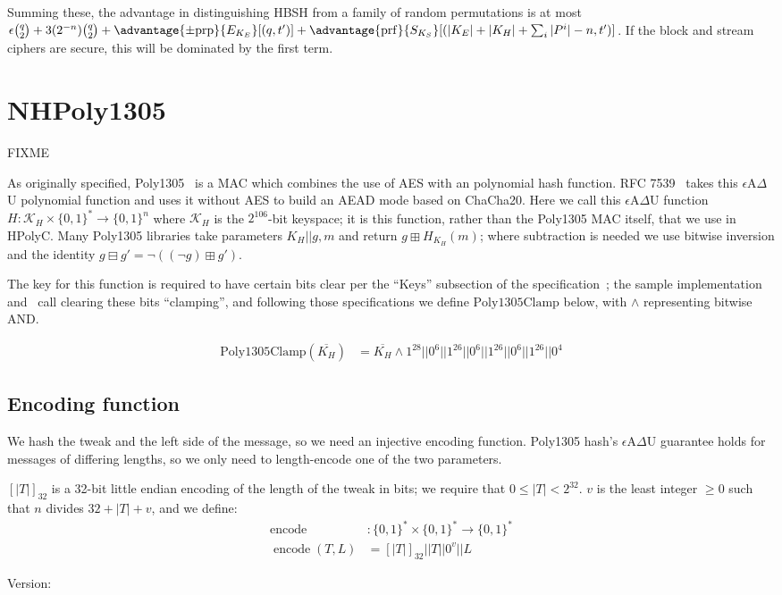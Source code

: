 \documentclass[journal=tosc,preprint,floatrow,submission]{iacrtrans}
\DeclareMathOperator{\encode}{encode}
\begin{document}
Summing these,
the advantage in distinguishing HBSH from a family of random permutations is at most
$\epsilon\binom{q}{2} + 3(2^{-n})\binom{q}{2}
+ \advantage{\pm \mathrm{prp}}{E_{K_E}}[(q, t')]
+ \advantage{\mathrm{prf}}{S_{K_S}}[(|K_E| + |K_H| + \sum_i |P^i|-n, t')]$.
If the block and stream ciphers are secure, this will be
dominated by the first term.

\printbibliography

\appendix
\section{NHPoly1305}\label{NHPoly1305}
FIXME

As originally specified, Poly1305~\cite{poly1305} is a MAC which combines the use of AES with an
polynomial hash function. RFC 7539~\cite{RFC7539} takes this
$\epsilon$A$\Delta$U polynomial function and
uses it without AES to build an AEAD mode based on ChaCha20.
Here we call this $\epsilon$A$\Delta$U function
$H: \mathcal{K}_H \times \{0,1\}^* \rightarrow \{0,1\}^n$ where $\mathcal{K}_H$
is the $2^{106}$-bit keyspace;
it is this function, rather than the Poly1305 MAC itself, that we use in HPolyC.
Many Poly1305 libraries
take parameters $K_H || g, m$ and return $g \boxplus H_{K_H}(m)$; where subtraction
is needed we use bitwise inversion and the identity
$g \boxminus g' = \neg ((\neg g) \boxplus g')$.

The key for this function is required to have certain bits clear per the ``Keys''
subsection of the specification~\cite{poly1305};
the sample implementation~\cite{poly1305clamp}
and~\cite{RFC7539} call clearing these bits ``clamping'', and following those
specifications we define $\mathrm{Poly1305Clamp}$
below, with $\wedge$ representing bitwise AND.

\begin{align*}
    \mathrm{Poly1305Clamp}(\overline{K_H})
    &= \overline{K_H} \wedge 1^{28} || 0^6 || 1^{26} || 0^6 || 1^{26} || 0^6 || 1^{26} || 0^4
\end{align*}

\subsection{Encoding function}
We hash the tweak and the left side of the message, so we need an injective encoding function.
Poly1305 hash's
$\epsilon$A$\Delta$U guarantee holds for messages of differing lengths, so we only need
to length-encode one of the two parameters.

$[|T|]_{32}$ is a 32-bit little endian encoding of the length of the tweak in bits; we
require that $0 \leq |T| < 2^{32}$.
$v$ is the least integer $\geq 0$ such that $n$ divides $32 + |T| + v$, and we define:
\begin{align*}
\encode &: \{0,1\}^* \times \{0,1\}^* \rightarrow \{0,1\}^* \\
\encode(T, L) &= [|T|]_{32} || T || 0^v || L
\end{align*}



Version: \texttt{}
\end{document}
